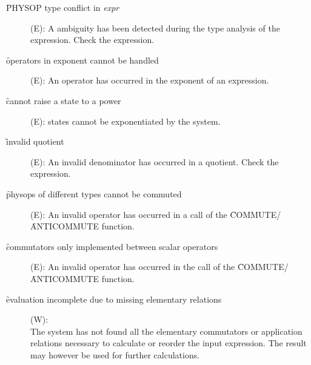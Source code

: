 \begin{description}
\item[\f{PHYSOP type conflict in} {\it expr}] (E): A ambiguity has been
detected during the type analysis of the expression. Check the
expression.

\item[\f{operators in exponent cannot be handled}] (E): An operator has
occurred in the exponent of an expression.

\item[\f{cannot raise a state to a power}] (E): states cannot be
exponentiated by the system.

\item[\f{invalid quotient}] (E): An invalid denominator has occurred in a
quotient. Check the expression.

\item[\f{physops of different types cannot be commuted}] (E): An invalid
operator has occurred in a call of the \f{COMMUTE}/\f{ANTICOMMUTE} function.

\item[\f{commutators only implemented between scalar operators}] (E):
An invalid operator has occurred in the call of the
\f{COMMUTE}/\f{ANTICOMMUTE} function.

\item[\f{evaluation incomplete due to missing elementary relations}] (W):
\\
The system has not found all
the elementary commutators or application relations necessary to
calculate or reorder the input expression. The result may however be
used for further calculations.
\end{description}
